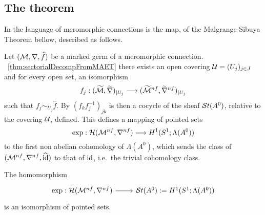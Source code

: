 \subsection{The theorem}

In the language of meromorphic connections is the map, of the Malgrange-Sibuya
Theorem bellow, described as follows.

Let $(\mathcal{M},\nabla,\widehat f)$ be a marked germ of a  meromorphic connection.
~\ref{thm:sectorialDecompFromMAET} there exists an open
covering $\mathcal{U}=(U_j)_{j\in J}$ and for every open set, an isomorphism
\[
  f_j:(\widetilde{\mathcal{M}},\widetilde\nabla)_{|U_j}
  \longrightarrow(\widetilde{\mathcal{M}}^{nf},\widetilde\nabla^{nf})_{|U_j}
\]
such that $f_j\sim_{U_j}\hat f$.
By $(f_kf_j^{-1})_{jk}$ is then a cocycle of the sheaf $\mathcal{S}{}t(A^0)$, relative
to the covering $\mathcal{U}$, defined.
This defines a mapping of pointed sets
\[
  \exp:\mathcal{H}(\mathcal{M}^{nf},\nabla^{nf})\longrightarrow H^1(S^1;\Lambda(A^0))
\]
to the first non abelian cohomology of $\Lambda(A^0)$, which sends the class of
$(\mathcal{M}^{nf},\nabla^{nf},\widehat{\operatorname{id}})$ to that of $\operatorname{id}$, i.e.\ the trivial cohomology
class.

\begin{center}
  \begin{minipage}[t]{0.8\textwidth}
    \begin{tthm} \label{thm:mainThm1MeromVersion}
      The homomorphism
      \[ \begin{tikzcd}
          \exp:\cH(\cM^{nf},\nabla^{nf}) \rar& \St(A^0):=H^1(S^1;\Lambda(A^0))
      \end{tikzcd} \]
      is an isomorphism of pointed sets.
    \end{tthm}
  \end{minipage}
\end{center}

